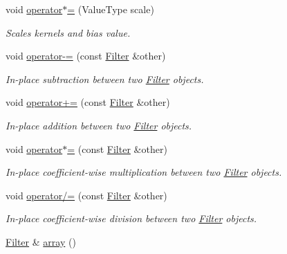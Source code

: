 \begin{DoxyCompactItemize}
\item 
void \hyperlink{structffnn_1_1layer_1_1convolution_1_1_filter_a31ad2addc83b961ba3aa94484f3105c1}{operator$\ast$=} (Value\-Type scale)
\begin{DoxyCompactList}\small\item\em Scales kernels and bias value. \end{DoxyCompactList}\item 
void \hyperlink{structffnn_1_1layer_1_1convolution_1_1_filter_a68631e15097cef37b64d617a4116366d}{operator-\/=} (const \hyperlink{structffnn_1_1layer_1_1convolution_1_1_filter}{Filter} \&other)
\begin{DoxyCompactList}\small\item\em In-\/place subtraction between two \hyperlink{structffnn_1_1layer_1_1convolution_1_1_filter}{Filter} objects. \end{DoxyCompactList}\item 
void \hyperlink{structffnn_1_1layer_1_1convolution_1_1_filter_a652ad028a03fce5960f9667d72f12bc7}{operator+=} (const \hyperlink{structffnn_1_1layer_1_1convolution_1_1_filter}{Filter} \&other)
\begin{DoxyCompactList}\small\item\em In-\/place addition between two \hyperlink{structffnn_1_1layer_1_1convolution_1_1_filter}{Filter} objects. \end{DoxyCompactList}\item 
void \hyperlink{structffnn_1_1layer_1_1convolution_1_1_filter_aa87862853be7ab7ce13f4815d430d639}{operator$\ast$=} (const \hyperlink{structffnn_1_1layer_1_1convolution_1_1_filter}{Filter} \&other)
\begin{DoxyCompactList}\small\item\em In-\/place coefficient-\/wise multiplication between two \hyperlink{structffnn_1_1layer_1_1convolution_1_1_filter}{Filter} objects. \end{DoxyCompactList}\item 
void \hyperlink{structffnn_1_1layer_1_1convolution_1_1_filter_ae3a7b3c906c14cf08789fd341117d1b3}{operator/=} (const \hyperlink{structffnn_1_1layer_1_1convolution_1_1_filter}{Filter} \&other)
\begin{DoxyCompactList}\small\item\em In-\/place coefficient-\/wise division between two \hyperlink{structffnn_1_1layer_1_1convolution_1_1_filter}{Filter} objects. \end{DoxyCompactList}\item 
\hyperlink{structffnn_1_1layer_1_1convolution_1_1_filter}{Filter} \& \hyperlink{structffnn_1_1layer_1_1convolution_1_1_filter_af69a171a3fd2701e0f69ddd1530a0cdb}{array} ()

\end{DoxyCompactItemize}

